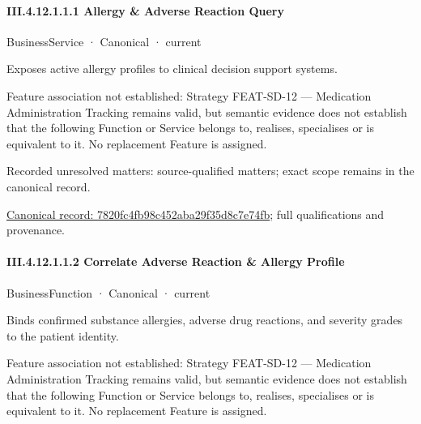 \paragraph*{III.4.12.1.1.1 Allergy \& Adverse Reaction Query}
\label{navigation:III.4.12.1.1.1}

\label{element:7820fc4fb98c452aba29f35d8c7e74fb}
{\small BusinessService · Canonical · current}\par

Exposes active allergy profiles to clinical decision support systems.



Feature association not established: Strategy FEAT-SD-12 — Medication Administration Tracking remains valid, but semantic evidence does not establish that the following Function or Service belongs to, realises, specialises or is equivalent to it. No replacement Feature is assigned.


{\small Recorded unresolved matters: source-qualified matters; exact scope remains in the canonical record.}\par
{\footnotesize \href{../../../../../../../../continuum/business/business-service/7820fc4fb98c452aba29f35d8c7e74fb.md}{Canonical record: 7820fc4fb98c452aba29f35d8c7e74fb}; full qualifications and provenance.}\par
\paragraph*{III.4.12.1.1.2 Correlate Adverse Reaction \& Allergy Profile}
\label{navigation:III.4.12.1.1.2}

\label{element:834d18fe21f14af7ad0c9773d2aaad1e}
{\small BusinessFunction · Canonical · current}\par

Binds confirmed substance allergies, adverse drug reactions, and severity grades to the patient identity.



Feature association not established: Strategy FEAT-SD-12 — Medication Administration Tracking remains valid, but semantic evidence does not establish that the following Function or Service belongs to, realises, specialises or is equivalent to it. No replacement Feature is assigned.


